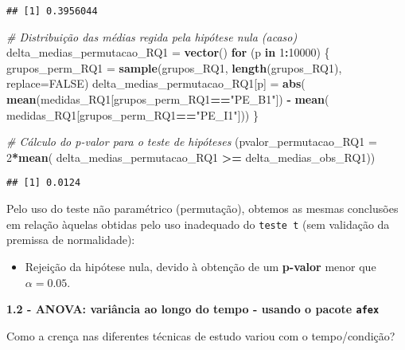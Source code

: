\documentclass[
]{article}
\newenvironment{Shaded}{\begin{snugshade}}{\end{snugshade}}
\newcommand{\AttributeTok}[1]{\textcolor[rgb]{0.13,0.29,0.53}{#1}}
\newcommand{\CommentTok}[1]{\textcolor[rgb]{0.56,0.35,0.01}{\textit{#1}}}
\newcommand{\ConstantTok}[1]{\textcolor[rgb]{0.56,0.35,0.01}{#1}}
\newcommand{\ControlFlowTok}[1]{\textcolor[rgb]{0.13,0.29,0.53}{\textbf{#1}}}
\newcommand{\DecValTok}[1]{\textcolor[rgb]{0.00,0.00,0.81}{#1}}
\newcommand{\FunctionTok}[1]{\textcolor[rgb]{0.13,0.29,0.53}{\textbf{#1}}}
\newcommand{\NormalTok}[1]{#1}
\newcommand{\OtherTok}[1]{\textcolor[rgb]{0.56,0.35,0.01}{#1}}
\newcommand{\SpecialCharTok}[1]{\textcolor[rgb]{0.81,0.36,0.00}{\textbf{#1}}}
\newcommand{\StringTok}[1]{\textcolor[rgb]{0.31,0.60,0.02}{#1}}
\providecommand{\tightlist}{%
  \setlength{\itemsep}{0pt}\setlength{\parskip}{0pt}}
\begin{document}
\begin{verbatim}
## [1] 0.3956044
\end{verbatim}

\begin{Shaded}
\begin{Highlighting}[]
\CommentTok{\# Distribuição das médias regida pela hipótese nula (acaso)}
\NormalTok{delta\_medias\_permutacao\_RQ1 }\OtherTok{=} \FunctionTok{vector}\NormalTok{()}
\ControlFlowTok{for}\NormalTok{ (p }\ControlFlowTok{in} \DecValTok{1}\SpecialCharTok{:}\DecValTok{10000}\NormalTok{)}
\NormalTok{\{}
\NormalTok{  grupos\_perm\_RQ1 }\OtherTok{=} \FunctionTok{sample}\NormalTok{(grupos\_RQ1, }\FunctionTok{length}\NormalTok{(grupos\_RQ1), }\AttributeTok{replace=}\ConstantTok{FALSE}\NormalTok{)}
\NormalTok{  delta\_medias\_permutacao\_RQ1[p] }\OtherTok{=} \FunctionTok{abs}\NormalTok{(}
    \FunctionTok{mean}\NormalTok{(medidas\_RQ1[grupos\_perm\_RQ1}\SpecialCharTok{==}\StringTok{"PE\_B1"}\NormalTok{]) }\SpecialCharTok{{-}} \FunctionTok{mean}\NormalTok{(}
\NormalTok{        medidas\_RQ1[grupos\_perm\_RQ1}\SpecialCharTok{==}\StringTok{"PE\_I1"}\NormalTok{]))}
\NormalTok{\}}

\CommentTok{\# Cálculo do p{-}valor para o teste de hipóteses}
\NormalTok{(}\AttributeTok{pvalor\_permutacao\_RQ1 =} \DecValTok{2}\SpecialCharTok{*}\FunctionTok{mean}\NormalTok{(}
\NormalTok{    delta\_medias\_permutacao\_RQ1 }\SpecialCharTok{\textgreater{}=}\NormalTok{ delta\_medias\_obs\_RQ1))}
\end{Highlighting}
\end{Shaded}

\begin{verbatim}
## [1] 0.0124
\end{verbatim}

Pelo uso do teste não paramétrico (permutação), obtemos as mesmas
conclusões em relação àquelas obtidas pelo uso inadequado do
\texttt{teste\ t} (sem validação da premissa de normalidade):

\begin{itemize}
\tightlist
\item
  Rejeição da hipótese nula, devido à obtenção de um \textbf{p-valor}
  menor que \(\alpha = 0.05\).
\end{itemize}

\textbf{1.2 - ANOVA: variância ao longo do tempo - usando o pacote
\texttt{afex}}

Como a crença nas diferentes técnicas de estudo variou com o
tempo/condição?
\end{document}
